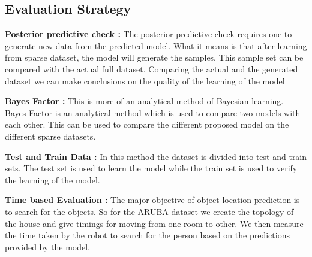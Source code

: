 \begin{itemize}
\section*{Evaluation Strategy}



\textbf{ Posterior predictive check :} The posterior predictive check requires one to generate new data from the predicted model. What it means is that after learning from sparse dataset, the model will generate the samples. This sample set can be compared with the actual full dataset. Comparing the actual and the generated dataset we can make conclusions on the quality of the learning of the model

\textbf{Bayes Factor :} This is more of an analytical method of Bayesian learning. Bayes Factor is an analytical method which is used to compare two models with each
other. This can be used to compare the different proposed model on the different sparse datasets.



\textbf{Test and Train Data :} In this method the dataset is divided into test and train sets. The test set is used to learn the model while the train set is used to verify the learning of the model.

\textbf{Time based Evaluation : } The major objective of object location prediction is to search for the objects. So for the ARUBA dataset we create the topology of the house and give timings for moving from one room to other. We then measure the time taken by the robot to search for the person based on the predictions provided by the model.
  
\end{itemize}
